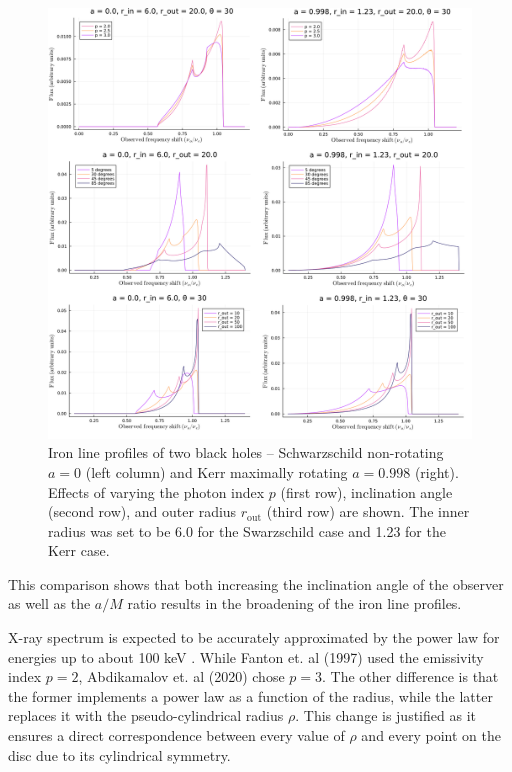 \documentclass[fleqn,usenatbib,useAMS]{mnras}
\begin{document}
\begin{figure}
    \centering
    \includegraphics[width=0.98\linewidth]{figures/fanton.png}
    \caption{Iron line profiles of two black holes -- Schwarzschild non-rotating $a = 0$ (left column) and Kerr maximally rotating $a = 0.998$ (right). Effects of varying the photon index $p$ (first row), inclination angle (second row), and outer radius $r_{\text{out}}$ (third row) are shown. The inner radius was set to be 6.0 for the Swarzschild case and 1.23 for the Kerr case.}
    \label{fanton}
\end{figure}

This comparison shows that both increasing the inclination angle of the observer as well as the $a/M$ ratio results in the broadening of the iron line profiles.

X-ray spectrum is expected to be accurately approximated by the power law for energies up to about 100 keV \cite{brenneman2006constraining}. While Fanton et. al (1997)\cite{fanton1997detecting} used the emissivity index $p = 2$, Abdikamalov et. al (2020)\cite{abdikamalov2020testing} chose $p = 3$. The other difference is that the former implements a power law as a function of the radius, while the latter replaces it with the pseudo-cylindrical radius $\rho$. This change is justified as it ensures a direct correspondence between every value of $\rho$ and every point on the disc due to its cylindrical symmetry. 
\end{document}
